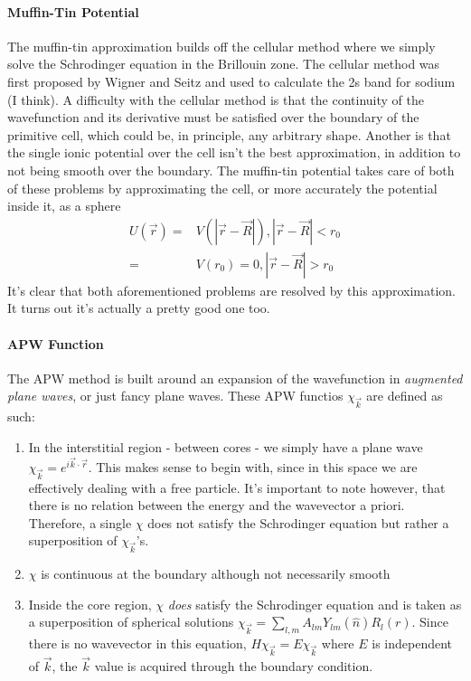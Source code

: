 \documentclass[11pt]{article}
\numberwithin{equation}{section}
\begin{document}
\paragraph{Muffin-Tin Potential}
The muffin-tin approximation builds off the cellular method where we simply solve the Schrodinger equation in the Brillouin zone. The cellular method was first proposed by Wigner and Seitz and used to calculate the 2s band for sodium (I think). A difficulty with the cellular method is that the continuity of the wavefunction and its derivative must be satisfied over the boundary of the primitive cell, which could be, in principle, any arbitrary shape. Another is that the single ionic potential over the cell isn't the best approximation, in addition to not being smooth over the boundary. The muffin-tin potential takes care of both of these problems by approximating the cell, or more accurately the potential inside it, as a sphere
\begin{align*}
U(\vec{r}) = &V(|\vec{r} - \vec{R}|), |\vec{r} - \vec{R}| < r_0 \\
= &V(r_0) = 0, |\vec{r} - \vec{R}| > r_0
\end{align*}
It's clear that both aforementioned problems are resolved by this approximation. It turns out it's actually a pretty good one too.

\paragraph{APW Function}
The APW method is built around an expansion of the wavefunction in \textit{augmented plane waves}, or just fancy plane waves. These APW functios $\chi_{\vec{k}}$ are defined as such:
\begin{enumerate}
\item In the interstitial region - between cores - we simply have a plane wave $\chi_{\vec{k}} = e^{i\vec{k}\cdot\vec{r}}$. This makes sense to begin with, since in this space we are effectively dealing with a free particle. It's important to note however, that there is no relation between the energy and the wavevector a priori. Therefore, a single $\chi$ does not satisfy the Schrodinger equation but rather a superposition of $\chi_{\vec{k}}$'s.

\item $\chi$ is continuous at the boundary although not necessarily smooth

\item Inside the core region, $\chi$ \textit{does} satisfy the Schrodinger equation and is taken as a superposition of spherical solutions $\chi_{\vec{k}} = \sum_{l,m}A_{lm}Y_{lm}(\hat{n})R_l(r)$. Since there is no wavevector in this equation, $H\chi_{\vec{k}} = E\chi_{\vec{k}}$ where $E$ is independent of $\vec{k}$, the $\vec{k}$ value is acquired through the boundary condition.
\end{enumerate}
\end{document}
